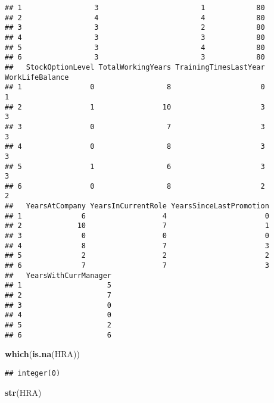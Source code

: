 \documentclass[]{article}
\newenvironment{Shaded}{\begin{snugshade}}{\end{snugshade}}
\newcommand{\KeywordTok}[1]{\textcolor[rgb]{0.13,0.29,0.53}{\textbf{#1}}}
\newcommand{\NormalTok}[1]{#1}
\begin{document}
\begin{verbatim}
## 1                 3                        1            80
## 2                 4                        4            80
## 3                 3                        2            80
## 4                 3                        3            80
## 5                 3                        4            80
## 6                 3                        3            80
##   StockOptionLevel TotalWorkingYears TrainingTimesLastYear WorkLifeBalance
## 1                0                 8                     0               1
## 2                1                10                     3               3
## 3                0                 7                     3               3
## 4                0                 8                     3               3
## 5                1                 6                     3               3
## 6                0                 8                     2               2
##   YearsAtCompany YearsInCurrentRole YearsSinceLastPromotion
## 1              6                  4                       0
## 2             10                  7                       1
## 3              0                  0                       0
## 4              8                  7                       3
## 5              2                  2                       2
## 6              7                  7                       3
##   YearsWithCurrManager
## 1                    5
## 2                    7
## 3                    0
## 4                    0
## 5                    2
## 6                    6
\end{verbatim}

\begin{Shaded}
\begin{Highlighting}[]
\KeywordTok{which}\NormalTok{(}\KeywordTok{is.na}\NormalTok{(HRA))}
\end{Highlighting}
\end{Shaded}

\begin{verbatim}
## integer(0)
\end{verbatim}

\begin{Shaded}
\begin{Highlighting}[]
\KeywordTok{str}\NormalTok{(HRA)}
\end{Highlighting}
\end{Shaded}
\end{document}
